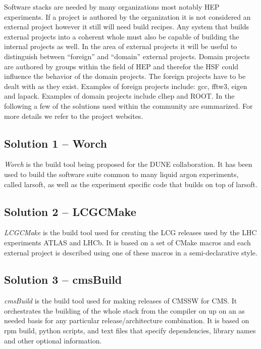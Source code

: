 \documentclass[12pt,a4paper]{article}
\begin{document}
Software stacks are needed by many organizations most notably HEP experiments.
If a project is authored by the organization it is not considered an external
project however it still will need build recipes. Any system that builds
external projects into a coherent whole must also be capable of building the
internal projects as well.  In the area of external projects it will be useful
to distinguish between ``foreign'' and ``domain'' external projects. Domain
projects are authored by groups within the field of HEP and therefor the HSF
could influence the behavior of the domain projects. The foreign projects have
to be dealt with as they exist. Examples of foreign projects include:
gcc, fftw3, eigen and lapack. Examples of domain projects include clhep and
ROOT. In the following a few of the solutions used within the community are
summarized. For more details we refer to the project websites.

\subsection{Solution 1 -- Worch}
\emph{Worch}\cite{worch} is the build tool being proposed for the DUNE
collaboration.  It has been used to build the software suite common to many
liquid argon experiments, called larsoft, as well as the experiment specific
code that builds on top of larsoft.

\subsection{Solution 2 -- LCGCMake}

\emph{LCGCMake}\cite{lcgcmake} is the build tool used for creating the LCG
releases used by the LHC experiments ATLAS and LHCb. It is based on a set of
CMake macros and each external project is described using one of these macros
in a semi-declarative style.

\subsection{Solution 3 -- cmsBuild}

\emph{cmsBuild}\cite{cmsbuild} is the build tool used for making releases of
CMSSW for CMS. It orchestrates the building of the whole stack from the
compiler on up on an as needed basis for any particular release/architecture
combination.  It is based on rpm build, python scripts, and text files that
specify dependencies, library names and other optional information.
\end{document}
